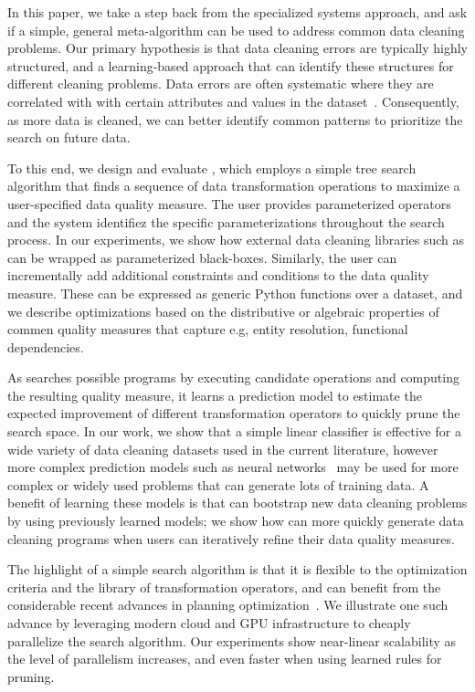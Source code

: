 In this paper, we take a step back from the specialized systems approach, and ask if a simple, general meta-algorithm can be used to address common data cleaning problems.  Our primary hypothesis is that data cleaning errors are typically highly structured, and a learning-based approach that can identify these structures for different cleaning problems.   
Data errors are often systematic where they are correlated with with certain attributes and values in the dataset~\cite{rekatsinas2017holoclean,DBLP:journals/pvldb/KrishnanWWFG16}.
Consequently, as more data is cleaned, we can better identify common patterns to prioritize the search on future data.

To this end, we design and evaluate \sys, which employs a simple tree search algorithm that finds a sequence of data transformation operations to maximize a user-specified data quality measure.   The user provides parameterized operators and the system identifiez the specific parameterizations throughout the search process.  In our experiments, we show how external data cleaning libraries such as  can be wrapped as parameterized black-boxes.  Similarly, the user can incrementally add additional constraints and conditions to the data quality measure.  These can be expressed as generic Python functions over a dataset, and we describe optimizations based on the distributive or algebraic properties of commen quality measures that capture e.g, entity resolution, functional dependencies.

As \sys searches possible programs by executing candidate operations and computing the resulting quality measure, it learns a prediction model to estimate the expected improvement of different transformation operators to quickly prune the search space.  In our work, we show that a simple linear classifier is effective for a wide variety of data cleaning datasets used in the current literature, however more complex prediction models such as neural networks~\cite{} may be used for more complex or widely used problems that can generate lots of training data.   A benefit of learning these models is that \sys can bootstrap new data cleaning problems by using previously learned models; we show how \sys can more quickly generate data cleaning programs when users can iteratively refine their data quality measures.

The highlight of a simple search algorithm is that it is flexible to the optimization criteria and the library of transformation operators, and can benefit from the considerable recent advances in planning optimization~\cite{silver2016mastering}. We illustrate one such advance by leveraging modern cloud and GPU infrastructure to cheaply parallelize the search algorithm.  Our experiments show near-linear scalability as the level of parallelism increases, and even faster when using learned rules for pruning.

